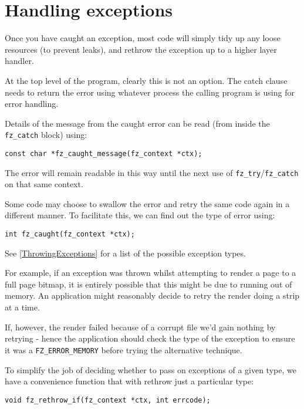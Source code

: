 \documentclass[oneside]{book}
\newcommand{\rjwref}[1] {\autoref{#1} \nameref{#1}}
\begin{document}
\section{Handling exceptions}

Once you have caught an exception, most code will simply tidy up any loose resources (to prevent leaks), and rethrow the exception up to a higher layer handler.

At the top level of the program, clearly this is not an option. The catch clause needs to return the error using whatever process the calling program is using for error handling.

Details of the message from the caught error can be read (from inside the \texttt{fz\_catch} block) using:

\begin{lstlisting}
const char *fz_caught_message(fz_context *ctx);
\end{lstlisting}

The error will remain readable in this way until the next use of \texttt{fz\_try}/\texttt{fz\_catch} on that same context.

Some code may choose to swallow the error and retry the same code again in a different manner. To facilitate this, we can find out the type of error using:

\begin{lstlisting}
int fz_caught(fz_context *ctx);
\end{lstlisting}

See \rjwref{ThrowingExceptions} for a list of the possible exception types.

For example, if an exception was thrown whilst attempting to render a page to a full page bitmap, it is entirely possible that this might be due to running out of memory. An application might reasonably decide to retry the render doing a strip at a time.

If, however, the render failed because of a corrupt file we'd gain nothing by retrying - hence the application should check the type of the exception to ensure it was a \texttt{FZ\_ERROR\_MEMORY} before trying the alternative technique.

To simplify the job of deciding whether to pass on exceptions of a given type, we have a convenience function that with rethrow just a particular type:

\begin{lstlisting}
void fz_rethrow_if(fz_context *ctx, int errcode);
\end{lstlisting}
\end{document}
